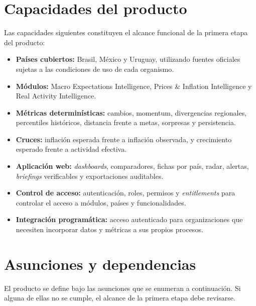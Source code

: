 \documentclass[11pt,a4paper]{article}
\newcommand{\modMacro}{Macro Expectations Intelligence}
\newcommand{\modPrecios}{Prices \& Inflation Intelligence}
\newcommand{\modActividad}{Real Activity Intelligence}
\begin{document}
\section{Capacidades del producto}

Las capacidades siguientes constituyen el alcance funcional de la primera etapa
del producto:

\begin{itemize}
  \item \textbf{Pa\'ises cubiertos:} Brasil, M\'exico y Uruguay, utilizando
        fuentes oficiales sujetas a las condiciones de uso de cada organismo.
  \item \textbf{M\'odulos:} \modMacro{}, \modPrecios{} y \modActividad{}.
  \item \textbf{M\'etricas determin\'isticas:} cambios, momentum, divergencias
        regionales, percentiles hist\'oricos, distancia frente a metas,
        sorpresas y persistencia.
  \item \textbf{Cruces:} inflaci\'on esperada frente a inflaci\'on observada, y
        crecimiento esperado frente a actividad efectiva.
  \item \textbf{Aplicaci\'on web:} \emph{dashboards}, comparadores, fichas por
        pa\'is, radar, alertas, \emph{briefings} verificables y exportaciones
        auditables.
  \item \textbf{Control de acceso:} autenticaci\'on, roles, permisos y
        \emph{entitlements} para controlar el acceso a m\'odulos, pa\'ises y
        funcionalidades.
  \item \textbf{Integraci\'on program\'atica:} acceso autenticado para
        organizaciones que necesiten incorporar datos y m\'etricas a sus propios
        procesos.
\end{itemize}

\section{Asunciones y dependencias}

El producto se define bajo las asunciones que se enumeran a continuaci\'on. Si
alguna de ellas no se cumple, el alcance de la primera etapa debe revisarse.
\end{document}

